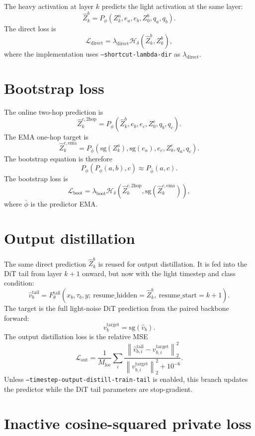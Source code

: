 \documentclass[11pt]{article}
\begin{document}
The heavy activation at layer $k$ predicts the light activation at the same
layer:
\[
  \widehat Z_k^b
  =
  P_\phi(Z_k^a,e_a,e_b,Z_0^b,q_a,q_b).
\]
The direct loss is
\[
  \mathcal{L}_{\mathrm{direct}}
  =
  \lambda_{\mathrm{direct}}
  \mathcal{H}_\delta(\widehat Z_k^b,Z_k^b),
\]
where the implementation uses \texttt{--shortcut-lambda-dir} as
$\lambda_{\mathrm{direct}}$.

\section{Bootstrap loss}

The online two-hop prediction is
\[
  \widehat Z_k^{c,\mathrm{2hop}}
  =
  P_\phi(\widehat Z_k^b,e_b,e_c,Z_0^c,q_b,q_c).
\]
The EMA one-hop target is
\[
  \widehat Z_k^{c,\mathrm{ema}}
  =
  P_{\bar\phi}(\mathrm{sg}(Z_k^a),\mathrm{sg}(e_a),e_c,Z_0^c,q_a,q_c).
\]
The bootstrap equation is therefore
\[
  P_\phi(P_\phi(a,b),c)\approx P_{\bar\phi}(a,c).
\]
The bootstrap loss is
\[
  \mathcal{L}_{\mathrm{boot}}
  =
  \lambda_{\mathrm{boot}}
  \mathcal{H}_\delta
  \left(
    \widehat Z_k^{c,\mathrm{2hop}},
    \mathrm{sg}(\widehat Z_k^{c,\mathrm{ema}})
  \right),
\]
where $\bar\phi$ is the predictor EMA.

\section{Output distillation}

The same direct prediction $\widehat Z_k^b$ is reused for output distillation.
It is fed into the DiT tail from layer $k+1$ onward, but now with the light
timestep and class condition:
\[
  \widehat v_b^{\mathrm{tail}}
  =
  F_\theta^{\mathrm{tail}}
  (x_b,\tau_b,y;\ \mathrm{resume\_hidden}=\widehat Z_k^b,\ 
   \mathrm{resume\_start}=k+1).
\]
The target is the full light-noise DiT prediction from the paired backbone
forward:
\[
  v_b^{\mathrm{target}}=\mathrm{sg}(\hat v_b).
\]
The output distillation loss is the relative MSE
\[
  \mathcal{L}_{\mathrm{out}}
  =
  \frac{1}{M_{\mathrm{loc}}}
  \sum_i
  \frac{
    \left\lVert \widehat v_{b,i}^{\mathrm{tail}}
      - v_{b,i}^{\mathrm{target}}\right\rVert_2^2
  }{
    \left\lVert v_{b,i}^{\mathrm{target}}\right\rVert_2^2 + 10^{-6}
  }.
\]
Unless \texttt{--timestep-output-distill-train-tail} is enabled, this branch
updates the predictor while the DiT tail parameters are stop-gradient.

\section{Inactive cosine-squared private loss}
\end{document}
